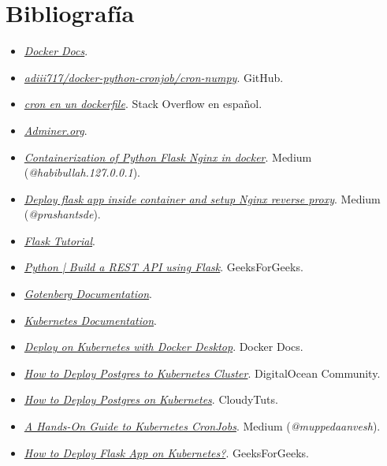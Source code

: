 \documentclass{report}
\begin{document}
    \chapter{Bibliografía}
        \begin{itemize}
            \item \href{https://docs.docker.com}{\textit{Docker Docs}}.
            \item \href{https://github.com/adiii717/docker-python-cronjob/tree/master/cron-numpy}{\textit{adiii717/docker-python-cronjob/cron-numpy}}. GitHub.
            \item \href{https://es.stackoverflow.com/questions/564186/cron-en-un-dockerfile}{\textit{cron en un dockerfile}}. Stack Overflow en español.
            \item \href{https://www.adminer.org/}{\textit{Adminer.org}}.
            \item \href{https://medium.com/@habibullah.127.0.0.1/containerization-of-python-flask-nginx-in-docker-7c451b3328b7}{\textit{Containerization of Python Flask Nginx in docker}}. Medium (\textit{@habibullah.127.0.0.1}).
            \item \href{https://medium.com/@prashantsde/deploy-flask-app-inside-container-and-setup-nginx-reverse-proxy-ac4407fe07c}{\textit{Deploy flask app inside container and setup Nginx reverse proxy}}. Medium (\textit{@prashantsde}).
            \item \href{https://flask.palletsprojects.com/en/stable/tutorial/}{\textit{Flask Tutorial}}.
            \item \href{https://www.geeksforgeeks.org/python-build-a-rest-api-using-flask)/}{\textit{Python | Build a REST API using Flask}}. GeeksForGeeks.
            \item \href{https://gotenberg.dev/docs/getting-started/introduction}{\textit{Gotenberg Documentation}}.
            \item \href{https://kubernetes.io/docs/home/}{\textit{Kubernetes Documentation}}.
            \item \href{https://docs.docker.com/desktop/features/kubernetes/}{\textit{Deploy on Kubernetes with Docker Desktop}}. Docker Docs.
            \item \href{https://www.digitalocean.com/community/tutorials/how-to-deploy-postgres-to-kubernetes-cluster}{\textit{How to Deploy Postgres to Kubernetes Cluster}}. DigitalOcean Community.
            \item \href{https://www.cloudytuts.com/guides/kubernetes/how-to-deploy-postgress-kubernetes/}{\textit{How to Deploy Postgres on Kubernetes}}. CloudyTuts.
            \item \href{https://medium.com/@muppedaanvesh/a-hand-on-guide-to-kubernetes-cronjobs-%EF%B8%8F-47393a98716d}{\textit{A Hands-On Guide to Kubernetes CronJobs}}. Medium (\textit{@muppedaanvesh}).
            \item \href{https://www.geeksforgeeks.org/how-to-deploy-flask-app-on-kubernetes/}{\textit{How to Deploy Flask App on Kubernetes?}}. GeeksForGeeks.
        \end{itemize}
\end{document}
